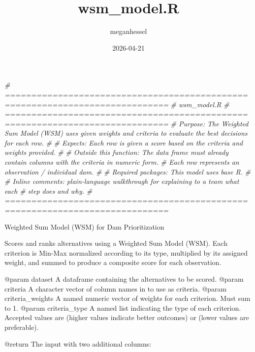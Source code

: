 \documentclass[
]{article}
\title{wsm\_model.R}
\author{meganhessel}
\date{2026-04-21}
\newenvironment{Shaded}{\begin{snugshade}}{\end{snugshade}}
\newcommand{\CommentTok}[1]{\textcolor[rgb]{0.56,0.35,0.01}{\textit{#1}}}
\begin{document}
\maketitle

\begin{Shaded}
\begin{Highlighting}[]
\CommentTok{\# =============================================================================}
\CommentTok{\# wsm\_model.R}
\CommentTok{\# =============================================================================}
\CommentTok{\# Purpose: The Weighted Sum Model (WSM) uses given weights and criteria to evaluate the best decisions for each row. }
\CommentTok{\#}
\CommentTok{\# Expects: Each row is given a score based on the criteria and weights provided.}
\CommentTok{\#}
\CommentTok{\# Outside this function: The data frame must already contain columns with the criteria in numeric form. }
\CommentTok{\# Each row represents an observation / individual dam.  }
\CommentTok{\# }
\CommentTok{\# Required packages: This model uses base R. }
\CommentTok{\#}
\CommentTok{\# Inline comments: plain{-}language walkthrough for explaining to a team what each}
\CommentTok{\# step does and why.}
\CommentTok{\# =============================================================================}
\end{Highlighting}
\end{Shaded}

Weighted Sum Model (WSM) for Dam Prioritization

Scores and ranks alternatives using a Weighted Sum Model (WSM). Each
criterion is Min-Max normalized according to its type, multiplied by its
assigned weight, and summed to produce a composite score for each
observation.

@param dataset A dataframe containing the alternatives to be scored.
@param criteria A character vector of column names in  to
use as criteria. @param criteria\_weights A named numeric vector of
weights for each criterion. Must sum to 1. @param criteria\_type A named
list indicating the type of each criterion. Accepted values are
 (higher values indicate better outcomes) or
 (lower values are preferable).

@return The input  with two additional columns: 
\end{document}
